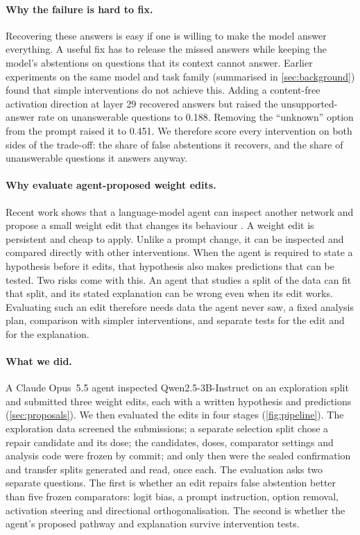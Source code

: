 \paragraph{Why the failure is hard to fix.}
Recovering these answers is easy if one is willing to make the model answer everything. A useful fix has to release
the missed answers while keeping the model's abstentions on questions that its context cannot answer. Earlier
experiments on the same model and task family (summarised in \cref{sec:background}) found that simple interventions
do not achieve this. Adding a content-free activation direction at layer 29 recovered answers but raised the
unsupported-answer rate on unanswerable questions to 0.188. Removing the ``unknown'' option from the prompt raised it
to 0.451. We therefore score every intervention on both sides of the trade-off: the share of false abstentions it
recovers, and the share of unanswerable questions it answers anyway.

\paragraph{Why evaluate agent-proposed weight edits.}
Recent work shows that a language-model agent can inspect another network and propose a small weight edit that
changes its behaviour \citep{takehi2026wsp}. A weight edit is persistent and cheap to apply. Unlike a prompt change,
it can be inspected and compared directly with other interventions. When the agent is required to state a hypothesis
before it edits, that hypothesis also makes predictions that can be tested. Two risks come with this. An agent that
studies a split of the data can fit that split, and its stated explanation can be wrong even when its edit works.
Evaluating such an edit therefore needs data the agent never saw, a fixed analysis plan, comparison with simpler
interventions, and separate tests for the edit and for the explanation.

\paragraph{What we did.}
A Claude Opus~5.5 agent inspected Qwen2.5-3B-Instruct on an exploration split and submitted three weight edits, each
with a written hypothesis and predictions (\cref{sec:proposals}). We then evaluated the edits in four stages
(\cref{fig:pipeline}). The exploration data screened the submissions; a separate selection split chose a repair
candidate and its dose; the candidates, doses, comparator settings and analysis code were frozen by commit; and only
then were the sealed confirmation and transfer splits generated and read, once each. The evaluation asks two separate
questions. The first is whether an edit repairs false abstention better than five frozen comparators: logit bias, a
prompt instruction, option removal, activation steering and directional orthogonalisation. The second is whether the
agent's proposed pathway and explanation survive intervention tests.

